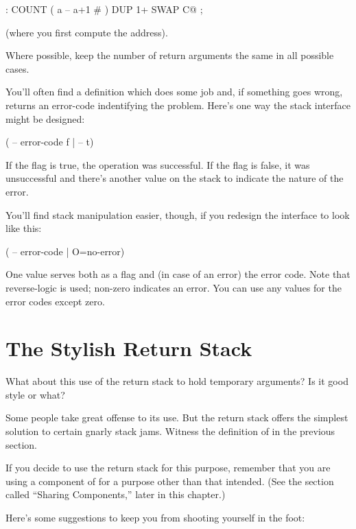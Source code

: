 \begin{Code}
: COUNT  ( a -- a+1 # )  DUP 1+  SWAP C@ ;
\end{Code}
(where you first compute the address).
\goodbreak

\begin{tip}
Where possible, keep the number of return arguments the same in all
possible cases.
\end{tip}%
You'll often find a definition which does some job and, if something goes
wrong, returns an error-code indentifying the problem. Here's one way
the stack interface might be designed:

\begin{Code}
( -- error-code f | -- t)
\end{Code}
If the flag is true, the operation was successful. If the flag is false, it was
unsuccessful and there's another value on the stack to indicate the nature
of the error.

You'll find stack manipulation easier, though, if you redesign the interface
to look like this:

\begin{Code}
( -- error-code | O=no-error)
\end{Code}
One value serves both as a flag and (in case of an error) the error code.
Note that reverse-logic is used; non-zero indicates an error. You can use
any values for the error codes except zero.%
%

\section{The Stylish Return Stack}%

What about this use of the return stack to hold temporary arguments? Is
it good style or what?

Some people take great offense to its use. But the return stack
offers the simplest solution to certain gnarly stack jams. Witness the
definition of  in the previous section.

If you decide to use the return stack for this purpose, remember
that you are using a component of \Forth{} for a purpose other than that
intended. (See the section called ``Sharing Components,'' later in this
chapter.)

Here's some suggestions to keep you from shooting yourself in the
foot:

